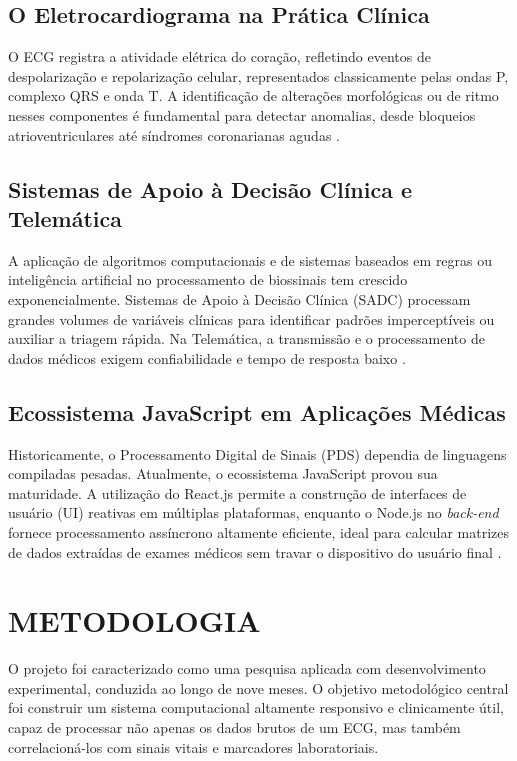 \documentclass[portuguese,12pt,oneside,a4paper]{book}
\begin{document}
\section{O Eletrocardiograma na Prática Clínica}
O ECG registra a atividade elétrica do coração, refletindo eventos de despolarização e repolarização celular, representados classicamente pelas ondas P, complexo QRS e onda T. A identificação de alterações morfológicas ou de ritmo nesses componentes é fundamental para detectar anomalias, desde bloqueios atrioventriculares até síndromes coronarianas agudas \cite{hannun2019}.

\section{Sistemas de Apoio à Decisão Clínica e Telemática}
A aplicação de algoritmos computacionais e de sistemas baseados em regras ou inteligência artificial no processamento de biossinais tem crescido exponencialmente. Sistemas de Apoio à Decisão Clínica (SADC) processam grandes volumes de variáveis clínicas para identificar padrões imperceptíveis ou auxiliar a triagem rápida. Na Telemática, a transmissão e o processamento de dados médicos exigem confiabilidade e tempo de resposta baixo \cite{hannun2019}.

\section{Ecossistema JavaScript em Aplicações Médicas}
Historicamente, o Processamento Digital de Sinais (PDS) dependia de linguagens compiladas pesadas. Atualmente, o ecossistema JavaScript provou sua maturidade. A utilização do React.js permite a construção de interfaces de usuário (UI) reativas em múltiplas plataformas, enquanto o Node.js no \textit{back-end} fornece processamento assíncrono altamente eficiente, ideal para calcular matrizes de dados extraídas de exames médicos sem travar o dispositivo do usuário final \cite{react2026, nodejs2026}.

\chapter{METODOLOGIA}

O projeto foi caracterizado como uma pesquisa aplicada com desenvolvimento experimental, conduzida ao longo de nove meses. O objetivo metodológico central foi construir um sistema computacional altamente responsivo e clinicamente útil, capaz de processar não apenas os dados brutos de um ECG, mas também correlacioná-los com sinais vitais e marcadores laboratoriais. 
\end{document}
